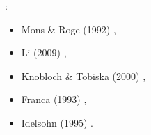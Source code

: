 \Literature: 
\begin{itemize}
\item Mons \& Roge (1992) \cite{moro92}, 
\item Li \etal (2009) \cite{lihc09}, 
\item Knobloch \& Tobiska (2000) \cite{knto00}, 
\item Franca \etal (1993) \cite{frha93}, 
\item Idelsohn \etal (1995) \cite{idsn95}.
\end{itemize}

